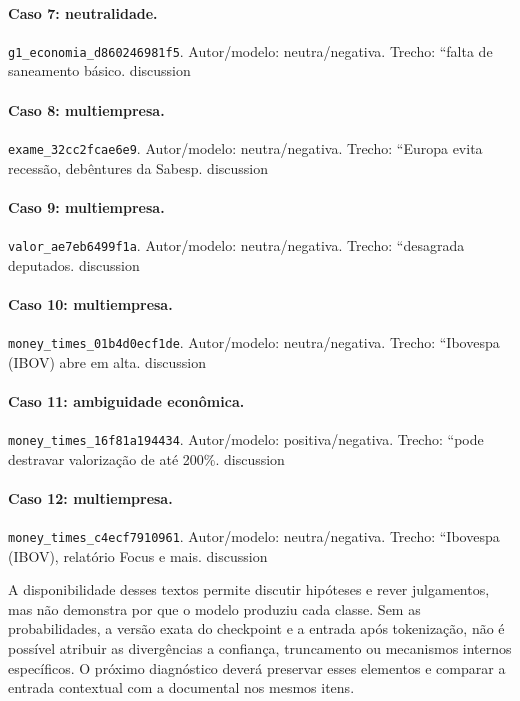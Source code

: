 \paragraph{Caso 7: neutralidade.}
\texttt{g1\_\allowbreak{}economia\_\allowbreak{}d860246981f5}. Autor/modelo: neutra/negativa. Trecho: ``falta de saneamento básico. {discussion}

\paragraph{Caso 8: multiempresa.}
\texttt{exame\_\allowbreak{}32cc2fcae6e9}. Autor/modelo: neutra/negativa. Trecho: ``Europa evita recessão, debêntures da Sabesp. {discussion}

\paragraph{Caso 9: multiempresa.}
\texttt{valor\_\allowbreak{}ae7eb6499f1a}. Autor/modelo: neutra/negativa. Trecho: ``desagrada deputados. {discussion}

\paragraph{Caso 10: multiempresa.}
\texttt{money\_\allowbreak{}times\_\allowbreak{}01b4d0ecf1de}. Autor/modelo: neutra/negativa. Trecho: ``Ibovespa (IBOV) abre em alta. {discussion}

\paragraph{Caso 11: ambiguidade econômica.}
\texttt{money\_\allowbreak{}times\_\allowbreak{}16f81a194434}. Autor/modelo: positiva/negativa. Trecho: ``pode destravar valorização de até 200\%. {discussion}

\paragraph{Caso 12: multiempresa.}
\texttt{money\_\allowbreak{}times\_\allowbreak{}c4ecf7910961}. Autor/modelo: neutra/negativa. Trecho: ``Ibovespa (IBOV), relatório Focus e mais. {discussion}

A disponibilidade desses textos permite discutir hipóteses e rever julgamentos, mas não demonstra por que o modelo produziu cada classe. Sem as probabilidades, a versão exata do checkpoint e a entrada após tokenização, não é possível atribuir as divergências a confiança, truncamento ou mecanismos internos específicos. O próximo diagnóstico deverá preservar esses elementos e comparar a entrada contextual com a documental nos mesmos itens.
